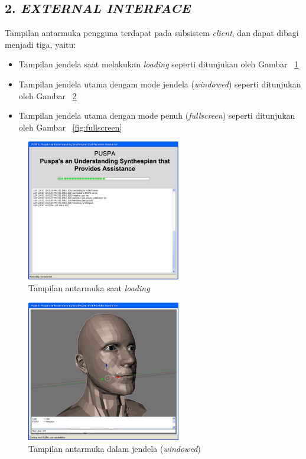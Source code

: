 \subsection*{\textcolor{subsectioncolor}{\textsf{2. \textit{EXTERNAL INTERFACE}}}}


Tampilan antarmuka pengguna terdapat pada subsistem \textit{client},
dan dapat dibagi menjadi tiga, yaitu:
\begin{itemize}
	\item Tampilan jendela saat melakukan \textit{loading} seperti ditunjukan oleh Gambar ~\ref{fig:loading}
	\item Tampilan jendela utama dengam mode jendela (\textit{windowed}) seperti ditunjukan oleh Gambar ~\ref{fig:windowed}
	\item Tampilan jendela utama dengan mode penuh (\textit{fullscreen}) seperti ditunjukan oleh Gambar ~\ref{fig:fullscreen}
\end{itemize}
\begin{figure}
	\centering
		\includegraphics[width=0.6\textwidth]{loading.png}
	\caption{Tampilan antarmuka saat \textit{loading}}
	\label{fig:loading}
\end{figure}
\begin{figure}
	\centering
		\includegraphics[width=0.6\textwidth]{windowed.png}
	\caption{Tampilan antarmuka dalam jendela (\textit{windowed})}
	\label{fig:windowed}
\end{figure}
